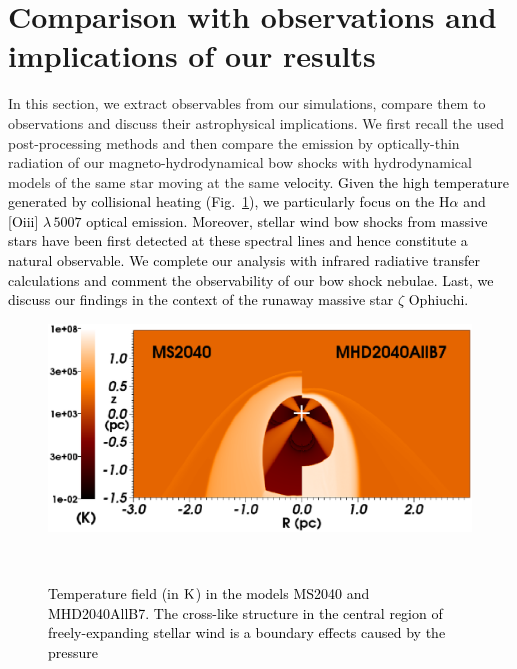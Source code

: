 \documentclass[useAMS,usenatbib]{mn2e}
\begin{document}
\section{Comparison with observations and implications of our results}
\label{sect:discussion}


In this section, we extract observables from our simulations, compare them to observations 
and discuss their astrophysical implications. 
We first recall the used post-processing methods and then compare 
the emission by optically-thin radiation 
of our magneto-hydrodynamical bow shocks with hydrodynamical
models of the same star moving at the same \textcolor{black}{velocity}.
\textcolor{black}{Given the high temperature generated by collisional heating (Fig.~\ref{fig:temperature}), 
we particularly focus on the H$\alpha$ and [O{\sc iii}] $\lambda \, 5007$ optical emission.   
Moreover, stellar wind bow shocks from massive stars have been first detected at these 
spectral lines and hence constitute a natural observable. } 
\textcolor{black}{
We complete our analysis with infrared radiative transfer calculations and 
comment the observability of our bow shock nebulae. Last, we discuss our findings in the
context of the runaway massive star $\zeta$ Ophiuchi.   
}

\begin{figure}
	\begin{minipage}[b]{ 0.48\textwidth}
		\includegraphics[width=1.0\textwidth]{./temperature_legend.eps}
	\end{minipage} \\  	
	\caption{
	         \textcolor{black}{Temperature field (in $\rm K$) in the models MS2040 and MHD2040AllB7. 
	         The cross-like structure in the  central region of freely-expanding 
	         stellar wind is a boundary effects caused by the pressure
	         }}
	\label{fig:temperature}  
\end{figure}
\end{document}
